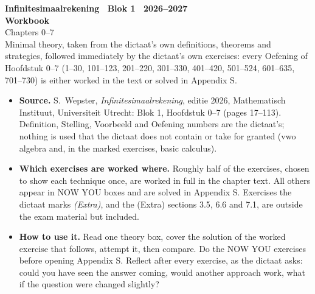 \thispagestyle{empty}
\begin{tcolorbox}[enhanced, colback=hblue, colframe=hblue, boxrule=0pt, arc=4pt, left=16pt, right=16pt, top=22pt, bottom=22pt]
  \color{white}\sffamily
  {\large\bfseries Infinitesimaalrekening \textperiodcentered\ Blok 1 \textperiodcentered\ 2026--2027}\\[10pt]
  {\fontsize{34}{38}\selectfont\bfseries Workbook}\\[6pt]
  {\fontsize{20}{24}\selectfont Chapters 0--7}\\[14pt]
  {\normalsize Minimal theory, taken from the dictaat's own definitions, theorems and strategies, followed immediately by the dictaat's own exercises: every Oefening of Hoofdstuk 0--7 (1--30, 101--123, 201--220, 301--330, 401--420, 501--524, 601--635, 701--730) is either worked in the text or solved in Appendix S.}
\end{tcolorbox}

\vspace{10pt}
\begin{tcolorbox}[enhanced, colback=white, colframe=hblue2, boxrule=0.8pt, arc=2pt, left=10pt, right=10pt, top=8pt, bottom=8pt]
\sffamily\small\sloppy
\begin{itemize}[leftmargin=1.2em]
\item \textbf{\textcolor{hblue}{Source.}} S.~Wepster, \emph{Infinitesimaalrekening}, editie 2026, Mathematisch Instituut, Universiteit Utrecht: Blok 1, Hoofdstuk 0--7 (pages 17--113). Definition, Stelling, Voorbeeld and Oefening numbers are the dictaat's; nothing is used that the dictaat does not contain or take for granted (vwo algebra and, in the marked exercises, basic calculus).
\item \textbf{\textcolor{hblue}{Which exercises are worked where.}} Roughly half of the exercises, chosen to show each technique once, are worked in full in the chapter text. All others appear in NOW YOU boxes and are solved in Appendix S. Exercises the dictaat marks \emph{(Extra)}, and the (Extra) sections 3.5, 6.6 and 7.1, are outside the exam material but included.
\item \textbf{\textcolor{hblue}{How to use it.}} Read one theory box, cover the solution of the worked exercise that follows, attempt it, then compare. Do the NOW YOU exercises before opening Appendix S. Reflect after every exercise, as the dictaat asks: could you have seen the answer coming, would another approach work, what if the question were changed slightly?
\end{itemize}
\end{tcolorbox}

